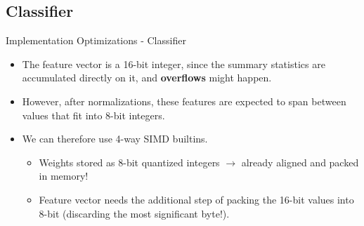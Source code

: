 \documentclass[10pt,aspectratio=169]{beamer}
\begin{document}
\subsection{Classifier}
\begin{frame}[fragile]{Implementation Optimizations - Classifier}
	\begin{itemize}
		\item The feature vector is a 16-bit integer, since the summary statistics are accumulated directly on it, and \textbf{overflows} might happen.
		\item However, after normalizations, these features are expected to span between values that fit into 8-bit integers.
		\item We can therefore use 4-way SIMD builtins.
		\begin{itemize}
			\item Weights stored as 8-bit quantized integers $\rightarrow$ already aligned and packed in memory!
			\item Feature vector needs the additional step of packing the 16-bit values into 8-bit (discarding the most significant byte!).
		\end{itemize}
	\end{itemize}
\end{frame}
\end{document}
